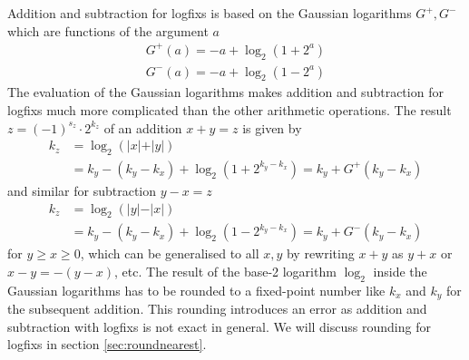Addition and subtraction for logfixs is based on the Gaussian logarithms $G^+,G^-$ which are functions of the argument $a$
\begin{align}
G^+(a) = -a + \log_2(1+2^a) \nonumber \\
G^-(a) = -a + \log_2(1-2^a)
\label{eq:gauss_log}
\end{align}
The evaluation of the Gaussian logarithms makes addition and subtraction for logfixs much more complicated than the other arithmetic operations.
The result $z = (-1)^{s_z} \cdot 2^{k_z}$ of an addition $x+y = z$ is given by
\begin{align}
k_z &= \log_2(\vert x \vert + \vert y \vert) \nonumber \\
	&= k_y - (k_y - k_x) + \log_2(1+2^{k_y - k_x})  = k_y + G^+(k_y-k_x)
\label{eq:logfix_add}
\end{align}
and similar for subtraction $y-x = z$
\begin{align}
k_z &= \log_2(\vert y \vert - \vert x \vert) \nonumber \\
	&= k_y - (k_y-k_x) + \log_2(1-2^{k_y - k_x}) = k_y + G^-(k_y-k_x)
\label{eq:logfix_sub}
\end{align}
for $y \geq x \geq 0$, which can be generalised to all $x,y$ by rewriting $x+y$ as $y+x$ or $x-y = -(y-x)$, etc. The result of the base-2 logarithm $\log_2$
inside the Gaussian logarithms has to be rounded to a fixed-point number like $k_x$ and $k_y$ for the subsequent addition. This rounding introduces an error
as addition and subtraction with logfixs is not exact in general. We will discuss rounding for logfixs in section \ref{sec:roundnearest}.

